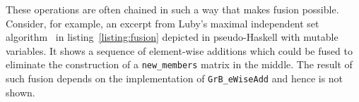 





These operations are often chained in such a way that makes fusion possible. Consider, for example, an excerpt from Luby's maximal independent set algorithm~\cite{SuiteSparseOnly} in listing~\ref{listing:fusion} depicted in pseudo-Haskell with mutable variables. It shows a sequence of element-wise additions which could be fused to eliminate the construction of a \texttt{new_members} matrix in the middle. The result of such fusion depends on the implementation of \texttt{GrB_eWiseAdd} and hence is not shown.


